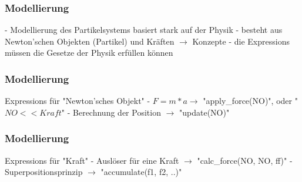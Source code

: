\documentclass{beamer}
\begin{document}
\begin{frame}
\frametitle{Modellierung}
- Modellierung des Partikelsystems basiert stark auf der Physik \linebreak
\linebreak
- besteht aus Newton'schen Objekten (Partikel) und Kr\"aften \linebreak
$\rightarrow$ Konzepte \linebreak
\linebreak
- die Expressions m\"ussen die Gesetze der Physik erf\"ullen k\"onnen
\end{frame}


\begin{frame}
\frametitle{Modellierung}

Expressions f\"ur "Newton'sches Objekt" \linebreak
\linebreak
- $F=m*a \rightarrow$  "apply\_force(NO)", oder "$NO << Kraft$" \linebreak
\linebreak
- Berechnung der Position $\rightarrow$ "update(NO)"
\end{frame}

\begin{frame}
\frametitle{Modellierung}

Expressions f\"ur "Kraft" \linebreak
\linebreak
- Ausl\"oser f\"ur eine Kraft $\rightarrow$ "calc\_force(NO, NO, ff)" \linebreak
\linebreak
- Superpositionsprinzip $\rightarrow$ "accumulate(f1, f2, ..)"
\end{frame}

\end{document}
